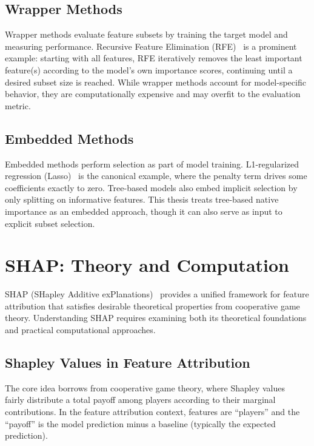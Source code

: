 \subsection{Wrapper Methods}

Wrapper methods evaluate feature subsets by training the target model and measuring performance. Recursive Feature Elimination (RFE)~\cite{Guyon2002Gene} is a prominent example: starting with all features, RFE iteratively removes the least important feature(s) according to the model's own importance scores, continuing until a desired subset size is reached. While wrapper methods account for model-specific behavior, they are computationally expensive and may overfit to the evaluation metric.

\subsection{Embedded Methods}

Embedded methods perform selection as part of model training. L1-regularized regression (Lasso)~\cite{tibshirani1996lasso} is the canonical example, where the penalty term drives some coefficients exactly to zero. Tree-based models also embed implicit selection by only splitting on informative features. This thesis treats tree-based native importance as an embedded approach, though it can also serve as input to explicit subset selection.

\section{SHAP: Theory and Computation}

SHAP (SHapley Additive exPlanations)~\cite{lundberg2017unified} provides a unified framework for feature attribution that satisfies desirable theoretical properties from cooperative game theory. Understanding SHAP requires examining both its theoretical foundations and practical computational approaches.

\subsection{Shapley Values in Feature Attribution}

The core idea borrows from cooperative game theory, where Shapley values~\cite{shapley1953value} fairly distribute a total payoff among players according to their marginal contributions. In the feature attribution context, features are ``players'' and the ``payoff'' is the model prediction minus a baseline (typically the expected prediction).

